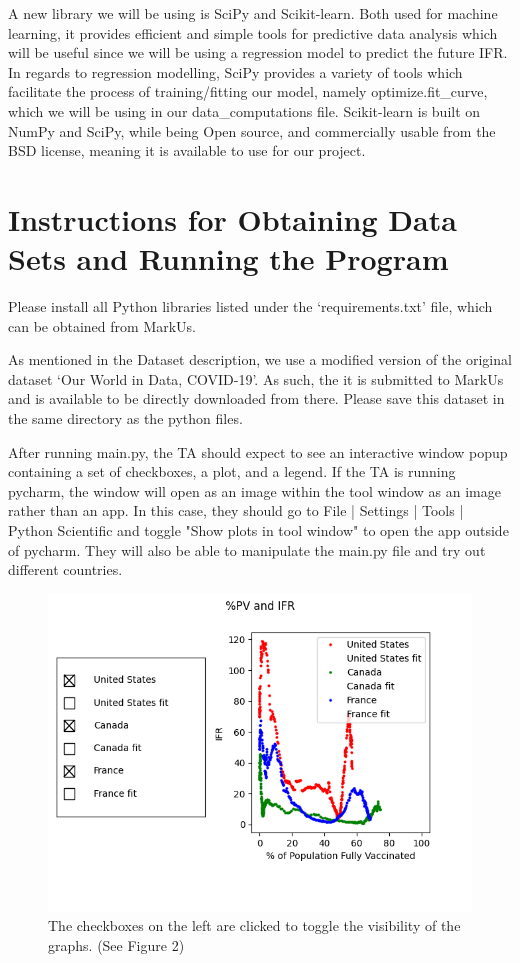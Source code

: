 \documentclass[fontsize=11pt]{article}
\begin{document}
A new library we will be using is SciPy and Scikit-learn. Both used for machine learning, it provides efficient and simple tools for predictive data analysis which will be useful since we will be using a regression model to predict the future IFR. In regards to regression modelling, SciPy provides a variety of tools which facilitate the process of training/fitting our model, namely optimize.fit\_curve, which we will be using in our data\_computations file. Scikit-learn is built on NumPy and SciPy, while being Open source, and commercially usable from the BSD license, meaning it is available to use for our project.  
  
  

\section*{Instructions for Obtaining Data Sets and Running the Program}

Please install all Python libraries listed under the `requirements.txt' file, which can be obtained from MarkUs.

As mentioned in the Dataset description, we use a modified version of the original dataset ‘Our World in Data, COVID-19’. As such, the it is submitted to MarkUs and is available to be directly downloaded from there. Please save this dataset in the same directory as the python files.


After running main.py, the TA should expect to see an interactive window popup containing a set of checkboxes, a plot, and a legend.
If the TA is running pycharm, the window will open as an image within the tool window as an image rather than an app.
In this case, they should go to File | Settings | Tools | Python Scientific and toggle "Show plots in tool window" to open the app outside of pycharm.
They will also be able to manipulate the main.py file and try out different countries.

\begin{figure}[htbp]
    \centerline{\includegraphics{Figure_1.png}}
    \caption{The checkboxes on the left are clicked to toggle the visibility of the graphs. (See Figure 2)}
\label{fig}
\end{figure}
\end{document}
